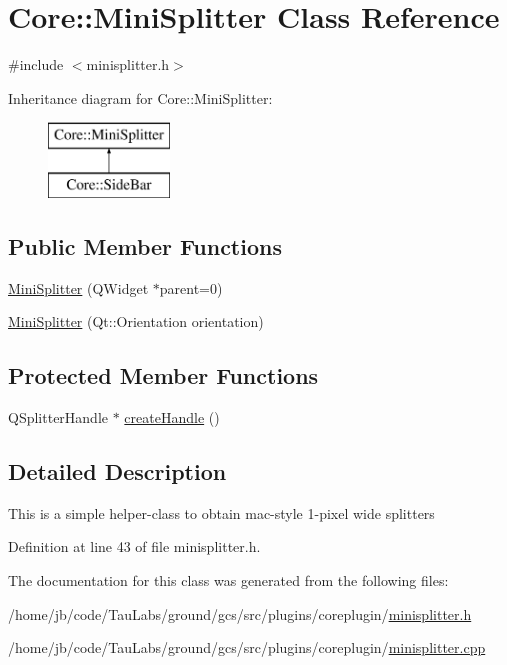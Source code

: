 \hypertarget{class_core_1_1_mini_splitter}{\section{\-Core\-:\-:\-Mini\-Splitter \-Class \-Reference}
\label{class_core_1_1_mini_splitter}
}


{\ttfamily \#include $<$minisplitter.\-h$>$}

\-Inheritance diagram for \-Core\-:\-:\-Mini\-Splitter\-:\begin{figure}[H]
\begin{center}
\leavevmode
\includegraphics[height=2.000000cm]{class_core_1_1_mini_splitter}
\end{center}
\end{figure}
\subsection*{\-Public \-Member \-Functions}
\begin{DoxyCompactItemize}
\item 
\hyperlink{group___core_plugin_ga0daa81d1f782306819ddd45944ba50cb}{\-Mini\-Splitter} (\-Q\-Widget $\ast$parent=0)
\item 
\hyperlink{group___core_plugin_ga75a5fe680b6339b267c9ca0c56f798b4}{\-Mini\-Splitter} (\-Qt\-::\-Orientation orientation)
\end{DoxyCompactItemize}
\subsection*{\-Protected \-Member \-Functions}
\begin{DoxyCompactItemize}
\item 
\-Q\-Splitter\-Handle $\ast$ \hyperlink{group___core_plugin_gad623d9fe534ec44acb1595afba592a44}{create\-Handle} ()
\end{DoxyCompactItemize}


\subsection{\-Detailed \-Description}
\-This is a simple helper-\/class to obtain mac-\/style 1-\/pixel wide splitters 

\-Definition at line 43 of file minisplitter.\-h.



\-The documentation for this class was generated from the following files\-:\begin{DoxyCompactItemize}
\item 
/home/jb/code/\-Tau\-Labs/ground/gcs/src/plugins/coreplugin/\hyperlink{minisplitter_8h}{minisplitter.\-h}\item 
/home/jb/code/\-Tau\-Labs/ground/gcs/src/plugins/coreplugin/\hyperlink{minisplitter_8cpp}{minisplitter.\-cpp}\end{DoxyCompactItemize}
